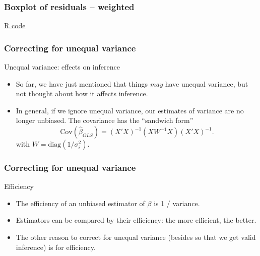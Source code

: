 \documentclass[handout]{beamer}
\begin{document}


   \begin{frame}
   \frametitle{Boxplot of residuals -- weighted}
   \begin{center}
   \end{center}
   \href{http://stats191.stanford.edu/transformations.html#education-example}{R code}
   \end{frame}


   \begin{frame} \frametitle{Correcting for unequal variance}

   \begin{block}
   {Unequal variance: effects on inference}
   \begin{itemize}
   \item So far, we have just mentioned that things {\em may} have unequal variance, but not thought about how it affects inference.

   \item In general, if we ignore unequal variance, our estimates of variance
   are no longer unbiased. The covariance has the ``sandwich form''
   $$
   \text{Cov}(\widehat{\beta}_{OLS}) = (X'X)^{-1}(XW^{-1}X)(X'X)^{-1}.
   $$
   with $W=\text{diag}(1/\sigma^2_i)$.
   \end{itemize}
   \end{block}
   \end{frame}


   \begin{frame} \frametitle{Correcting for unequal variance}

   \begin{block}
   {Efficiency}
   \begin{itemize}
   \item The efficiency of an unbiased estimator of $\beta$
    is 1 / variance.

   \item Estimators can be compared by their efficiency: the more efficient, the better.

   \item The other reason to correct for unequal variance (besides so that we get valid inference) is for efficiency.
   \end{itemize}
   \end{block}
   \end{frame}
\end{document}
